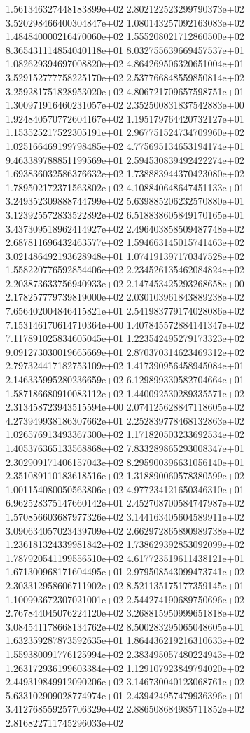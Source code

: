 1.561346327448183899e+02 2.802122523299790373e+02 3.520298466400304847e+02
1.080143257092163083e+02 1.484840000216470060e+02 1.555208021712860500e+02
8.365431114854040118e+01 8.032755639669457537e+01 1.082629394697008820e+02
4.864269506320651004e+01 3.529152777758225170e+02 2.537766848559850814e+02
3.259281751828953020e+02 4.806721709657598751e+01 1.300971916460231057e+02
2.352500831837542883e+00 1.924840570772604167e+02 1.195179764420732127e+01
1.153525217522305191e+01 2.967751524734709960e+02 1.025166469199798485e+02
4.775695134653194174e+01 9.463389788851199569e+01 2.594530839492422274e+02
1.693836032586376632e+02 1.738883944370423080e+02 1.789502172371563802e+02
4.108840648647451133e+01 3.249352309888744799e+02 5.639885206232570880e+01
3.123925572833522892e+02 6.518838605849170165e+01 3.437309518962414927e+02
2.496403858509487748e+02 2.687811696432463577e+02 1.594663145015741463e+02
3.021486492193628948e+01 1.074191397170347528e+02 1.558220776592854406e+02
2.234526135462084824e+02 2.203873633756940933e+02 2.147453425293268658e+00
2.178257779739819000e+02 2.030103961843889238e+02 7.656402004846415821e+01
2.541983779174028086e+02 7.153146170614710364e+00 1.407845572884141347e+02
7.117891025834605045e+01 1.223542495279173323e+02 9.091273030019665669e+01
2.870370314623469312e+02 2.797324417182753109e+02 1.417390956458945084e+01
2.146335995280236659e+02 6.129899330582704664e+01 1.587186680910083112e+02
1.440092530289335571e+02 2.313458723943515594e+00 2.074125628847118605e+02
4.273949938186307662e+01 2.252839778468132863e+02 1.026576913493367300e+02
1.171820503233692534e+02 1.405376365133568868e+02 7.833289865293008347e+01
2.302909171406157043e+02 8.295900396631056140e+01 2.351089110183618516e+02
1.318890060578380599e+02 1.001154080050563806e+02 4.977234121650346310e+01
6.962528375147660142e+01 2.452708700584747987e+02 1.570856603687977326e+02
3.144163405604589911e+02 3.090634057023439709e+02 2.662972865890989738e+02
1.236181324339981842e+02 1.738629392853092099e+02 1.787920541199556510e+02
4.617723519611438121e+01 1.671300968171604495e+01 2.979508543099473741e+02
2.303312958606711902e+02 8.521135175177359145e+01 1.100993672307021001e+02
2.544274190689750696e+02 2.767844045076224120e+02 3.268815950999651818e+02
3.084541178668134762e+02 8.500283295065048605e+01 1.632359287873592635e+01
1.864436219216310633e+02 1.559380091776125994e+02 2.383495057480224943e+02
1.263172936199603384e+02 1.129107923849794020e+02 2.449319849912090206e+02
3.146730040123068761e+02 5.633102909028774974e+01 2.439424957479936396e+01
3.412768559257706329e+02 2.886508684985711852e+02 2.816822711745296033e+02
